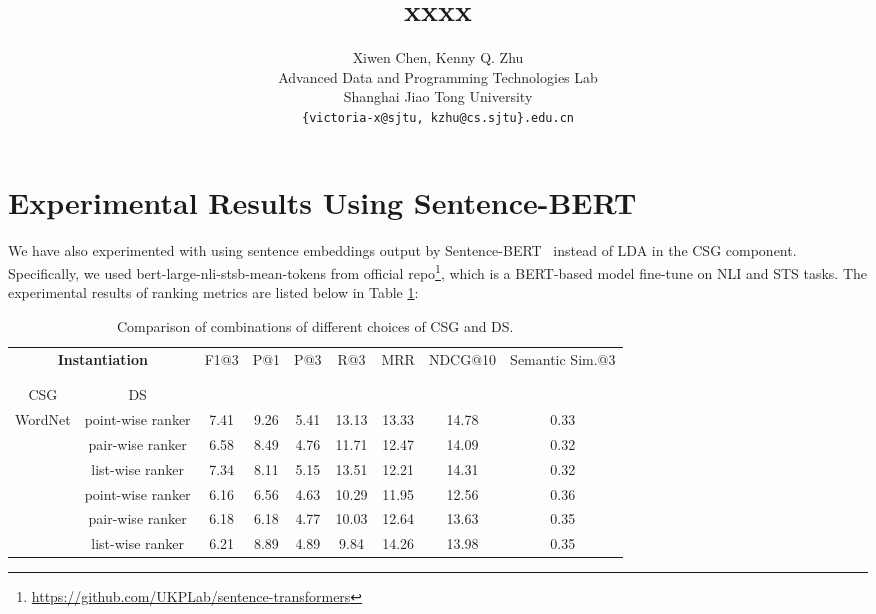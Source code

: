 \documentclass[11pt,a4paper]{article}
\title{xxxx}
\author{Xiwen Chen, Kenny Q. Zhu \\
	Advanced Data and Programming Technologies Lab \\
	Shanghai Jiao Tong University \\
	\texttt{\{victoria-x@sjtu, kzhu@cs.sjtu\}.edu.cn} \\
}
\date{}
\begin{document}
\appendix
\section{Experimental Results Using Sentence-BERT}
\label{ap:datastats}
We have also experimented with using sentence embeddings output by Sentence-BERT~\citep{reimers2019sentencebert} instead of LDA in the CSG component. Specifically, we used bert-large-nli-stsb-mean-tokens from official repo\footnote{\url{https://github.com/UKPLab/sentence-transformers}}, which is a BERT-based model fine-tune on NLI and STS tasks. The experimental results of ranking metrics are listed below in Table \ref{table:instantiations}:
\begin{table}[h]
	\small
	\centering
	\begin{tabular}{cc c c c c c c c}
		\toprule
		\multicolumn{2}{c}{\textbf{Instantiation}} &\multirow{2}{*}{F1@3} &\multirow{2}{*}{P@1} &\multirow{2}{*}{P@3} &\multirow{2}{*}{R@3} &\multirow{2}{*}{MRR} &\multirow{2}{*}{NDCG@10} &\multirow{2}{*}{Semantic Sim.@3} \\
		\\ [-1.8ex]
		\cline{1-2}
		\\ [-1.8ex]
		CSG &DS & & & & & & &\\
		\midrule
		\multirow{4}{*}{WordNet} 
		&point-wise ranker &7.41 &9.26 &5.41 &13.13 &13.33 &14.78 &0.33 \\
		&pair-wise ranker &6.58 &8.49 &4.76 &11.71  &12.47 &14.09 &0.32 \\
		&list-wise ranker &7.34 &8.11 &5.15 &13.51 &12.21 &14.31 &0.32 \\
		\midrule
		\multirow{4}{*}{Probase} 
		&point-wise ranker &6.16 &6.56 &4.63 &10.29  &11.95 &12.56 &0.36 \\	
		&pair-wise ranker &6.18 &6.18 &4.77 &10.03  &12.64 &13.63 &0.35 \\
		&list-wise ranker &6.21 &8.89 &4.89 &9.84 &14.26 &13.98 &0.35 \\
		\bottomrule
	\end{tabular}
	\caption{Comparison of combinations of different choices of CSG and DS.}
	\label{table:instantiations}
\end{table}
%
\end{document}
